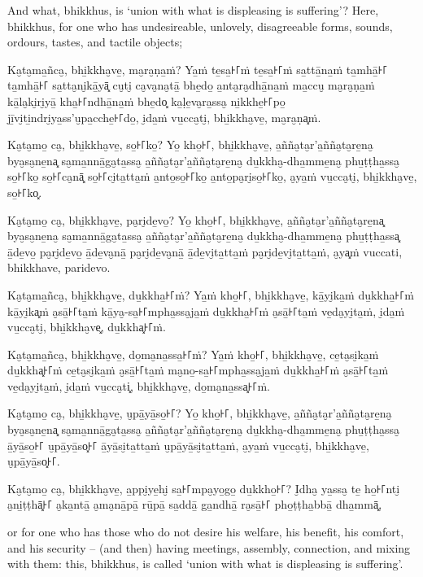And what, bhikkhus, is `union with what is displeasing is suffering'? Here,
bhikkhus, for one who has undesireable, unlovely, disagreeable forms, sounds,
ordours, tastes, and tactile objects;

\paliPage

Ka̮ta̮ma̱ñca̮, bhi̱kkha̮ve̱, ma̮ra̮ṇa̱ṁ? Ya̱ṁ te̱sa̱꜔꜒ṁ te̱sa̱꜔꜒ṁ sa̱ttā̱na̱ṁ ta̱mhā̱꜔꜒ ta̱mhā̱꜔꜒ sa̱tta̮ni̮kā̱yā͓
cu̮ti̮ ca̮va̮na̮tā̱ bhe̱do̱ a̱nta̮ra̮dhā̱na̱ṁ ma̱ccu̮ ma̮ra̮ṇa̱ṁ kā̱la̮ki̮ri̮yā̱ kha̱꜔꜒ndhā̱na̱ṁ bhe̱do͓
ka̱ḷe̱va̮ra̱ssa̮ ni̱kkhe̱꜔꜒po̱ jī̱vi̮ti̱ndri̮ya̱ss'u̮pa̱cche̱꜔꜒do̱, i̮da̱ṁ vu̱cca̮ti̮, bhi̱kkha̮ve̱, ma̮ra̮ṇa͓ṁ.

Ka̮ta̮mo̱ ca̮, bhi̱kkha̮ve̱, so̱꜔꜒ko̱? Yo̱ kho̱꜔꜒, bhi̱kkha̮ve̱, a̱ñña̮ta̮r'a̱ñña̮ta̮re̱na̮ bya̮sa̮ne̱na͓
sa̮ma̱nnā̱ga̮ta̱ssa̮ a̱ñña̮ta̮r'a̱ñña̮ta̮re̱na̮ du̱kkha̮-dha̱mme̱na̮ phu̱ṭṭha̱ssa̮ so̱꜔꜒ko̱ so̱꜔꜒ca̮nā͓
so̱꜔꜒ci̮ta̱tta̱ṁ a̱nto̱so̱꜔꜒ko̱ a̱nto̱pa̮ri̮so̱꜔꜒ko̱, a̮ya̱ṁ vu̱cca̮ti̮, bhi̱kkha̮ve̱, so̱꜔꜒ko͓.

Ka̮ta̮mo̱ ca̮, bhi̱kkha̮ve̱, pa̮ri̮de̱vo̱? Yo̱ kho̱꜔꜒, bhi̱kkha̮ve̱, a̱ñña̮ta̮r'a̱ñña̮ta̮re̱na͓
bya̮sa̮ne̱na̮ sa̮ma̱nnā̱ga̮ta̱ssa̮ a̱ñña̮ta̮r'a̱ñña̮ta̮re̱na̮ du̱kkha̮-dha̱mme̱na̮ phu̱ṭṭha̱ssa͓
ā̱de̱vo̱ pa̮ri̮de̱vo̱ ā̱de̱va̮nā̱ pa̮ri̮de̱va̮nā̱ ā̱de̱vi̮ta̱tta̱ṁ pa̮ri̮de̱vi̮ta̱tta̱ṁ, a̮ya͓ṁ
vuccati, bhikkhave, paridevo.

Ka̮ta̮ma̱ñca̮, bhi̱kkha̮ve̱, du̱kkha̱꜔꜒ṁ? Ya̱ṁ kho̱꜔꜒, bhi̱kkha̮ve̱, kā̱yi̮ka̱ṁ du̱kkha̱꜔꜒ṁ kā̱yi̮ka͓ṁ
a̮sā̱꜔꜒ta̱ṁ kā̱ya̮-sa̱꜔꜒mpha̱ssa̮ja̱ṁ du̱kkha̱꜔꜒ṁ a̮sā̱꜔꜒ta̱ṁ ve̱da̮yi̮ta̱ṁ, i̮da̱ṁ vu̱cca̮ti̮, bhi̱kkha̮ve͓,
du̱kkha͓꜔꜒ṁ.

Ka̮ta̮ma̱ñca̮, bhi̱kkha̮ve̱, do̱ma̮na̱ssa̱꜔꜒ṁ? Ya̱ṁ kho̱꜔꜒, bhi̱kkha̮ve̱, ce̱ta̮si̮ka̱ṁ du̱kkha͓꜔꜒ṁ
ce̱ta̮si̮ka̱ṁ a̮sā̱꜔꜒ta̱ṁ ma̮no̱-sa̱꜔꜒mpha̱ssa̮ja̱ṁ du̱kkha̱꜔꜒ṁ a̮sā̱꜔꜒ta̱ṁ ve̱da̮yi̮ta̱ṁ, i̮da̱ṁ vu̱cca̮ti͓,
bhi̱kkha̮ve̱, do̱ma̮na̱ssa͓꜔꜒ṁ.

Ka̮ta̮mo̱ ca̮, bhi̱kkha̮ve̱, u̮pā̱yā̱so̱꜔꜒? Yo̱ kho̱꜔꜒, bhi̱kkha̮ve̱, a̱ñña̮ta̮r'a̱ñña̮ta̮re̱na̮ bya̮sa̮ne̱na͓
sa̮ma̱nnā̱ga̮ta̱ssa̮ a̱ñña̮ta̮r'a̱ñña̮ta̮re̱na̮ du̱kkha̮-dha̱mme̱na̮ phu̱ṭṭha̱ssa̮ ā̱yā̱so̱꜔꜒ u̮pā̱yā̱so͓꜔꜒
ā̱yā̱si̮ta̱tta̱ṁ u̮pā̱yā̱si̮ta̱tta̱ṁ, a̮ya̱ṁ vu̱cca̮ti̮, bhi̱kkha̮ve̱, u̮pā̱yā̱so͓꜔꜒.

Ka̮ta̮mo̱ ca̮, bhi̱kkha̮ve̱, a̱ppi̮ye̱hi̮ sa̱꜔꜒mpa̮yo̱go̱ du̱kkho̱꜔꜒? I̮dha̮ ya̱ssa̮ te̱ ho̱꜔꜒nti̮ a̮ni̱ṭṭhā͓꜔꜒
a̮ka̱ntā̱ a̮ma̮nā̱pā̱ rū̱pā̱ sa̱ddā̱ ga̱ndhā̱ ra̮sā̱꜔꜒ pho̱ṭṭha̱bbā̱ dha̱mmā͓,

\englishPage

or for one who has those who do not desire his welfare, his benefit, his
comfort, and his security -- (and then) having meetings, assembly, connection,
and mixing with them: this, bhikkhus, is called `union with what is displeasing
is suffering'.


